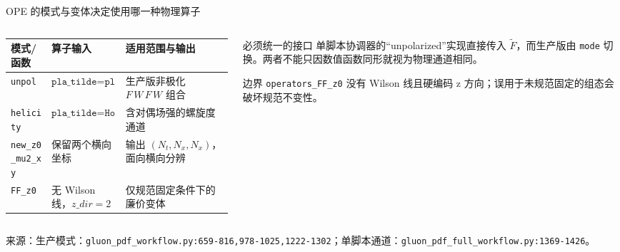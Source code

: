 \documentclass[UTF8,aspectratio=169,11pt]{ctexbeamer}
\newcommand{\source}[1]{%
  \vspace{0.06em}\par{\raggedright\scriptsize\color{muted}来源：#1\par}}
\newcommand{\codepath}[1]{\nolinkurl{#1}}
\begin{document}
\begin{frame}[t]{OPE 的模式与变体决定使用哪一种物理算子}
  \begin{columns}[T,totalwidth=\textwidth]
    \begin{column}{0.56\textwidth}
      \scriptsize
      \begin{tabularx}{\linewidth}{@{}lYY@{}}
        \toprule
        模式/函数 & 算子输入 & 适用范围与输出 \\
        \midrule
        \codepath{unpol} & \(\texttt{pla\_tilde=pla}\) & 生产版非极化 \(F\,W\,F\,W\) 组合 \\
        \codepath{helicity} & \(\texttt{pla\_tilde=Hodge(pla)}\) & 含对偶场强的螺旋度通道 \\
        \codepath{new_z0_mu2_xy} & 保留两个横向坐标 & 输出 \((N_t,N_x,N_x)\)，面向横向分辨 \\
        \codepath{FF_z0} & 无 Wilson 线，\(z\_dir=2\) & 仅规范固定条件下的廉价变体 \\
        \bottomrule
      \end{tabularx}
    \end{column}
    \begin{column}{0.38\textwidth}
      \begin{block}{必须统一的接口}
        单脚本协调器的“unpolarized”实现直接传入 \(\widetilde F\)，而生产版由
        \codepath{mode} 切换。两者不能只因数值函数同形就视为物理通道相同。
      \end{block}
      \begin{block}{边界}
        \codepath{operators_FF_z0} 没有 Wilson 线且硬编码 z 方向；误用于未规范固定的组态会破坏规范不变性。
      \end{block}
    \end{column}
  \end{columns}
  \source{生产模式：\codepath{gluon_pdf_workflow.py:659-816,978-1025,1222-1302}；单脚本通道：\codepath{gluon_pdf_full_workflow.py:1369-1426}。}
\end{frame}
\end{document}
